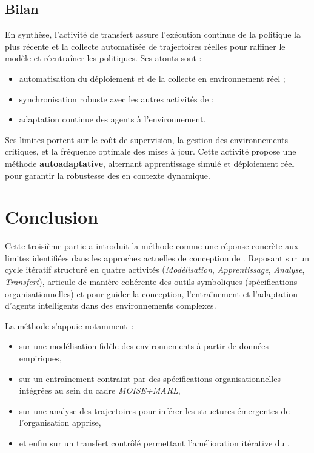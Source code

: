 \section{Bilan}

En synthèse, l'activité de transfert assure l'exécution continue de la politique la plus récente et la collecte automatisée de trajectoires réelles pour raffiner le modèle et réentraîner les politiques.
%
Ses atouts sont :
\begin{itemize}
  \item automatisation du déploiement et de la collecte en environnement réel ;
  \item synchronisation robuste avec les autres activités de  ;
  \item adaptation continue des agents à l'environnement.
\end{itemize}

Ses limites portent sur le coût de supervision, la gestion des environnements critiques, et la fréquence optimale des mises à jour.
%
Cette activité propose une méthode \textbf{autoadaptative}, alternant apprentissage simulé et déploiement réel pour garantir la robustesse des  en contexte dynamique.



\clearpage
\thispagestyle{empty}
\null
\newpage

\chapter*{Conclusion}

\noindent
Cette troisième partie a introduit la méthode \textbf{} comme une réponse concrète aux limites identifiées dans les approches actuelles de conception de . Reposant sur un cycle itératif structuré en quatre activités (\textit{Modélisation}, \textit{Apprentissage}, \textit{Analyse}, \textit{Transfert}),  articule de manière cohérente des outils symboliques (spécifications organisationnelles) et  pour guider la conception, l'entraînement et l'adaptation d'agents intelligents dans des environnements complexes.

\medskip

\noindent
La méthode s'appuie notamment~:
\begin{itemize}
  \item sur une modélisation fidèle des environnements à partir de données empiriques,
  \item sur un entraînement contraint par des spécifications organisationnelles intégrées au sein du cadre \textit{MOISE+MARL},
  \item sur une analyse des trajectoires pour inférer les structures émergentes de l'organisation apprise,
  \item et enfin sur un transfert contrôlé permettant l'amélioration itérative du .
\end{itemize}

